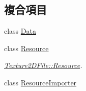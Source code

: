 \subsection*{複合項目}
\begin{DoxyCompactItemize}
\item 
class \hyperlink{class_magnum_1_1_texture2_d_file_1_1_data}{Data}
\item 
class \hyperlink{class_magnum_1_1_texture2_d_file_1_1_resource}{Resource}
\begin{DoxyCompactList}\small\item\em \hyperlink{class_magnum_1_1_texture2_d_file_1_1_resource}{Texture2\+D\+File\+::\+Resource}. \end{DoxyCompactList}\item 
class \hyperlink{class_magnum_1_1_texture2_d_file_1_1_resource_importer}{Resource\+Importer}
\end{DoxyCompactItemize}
